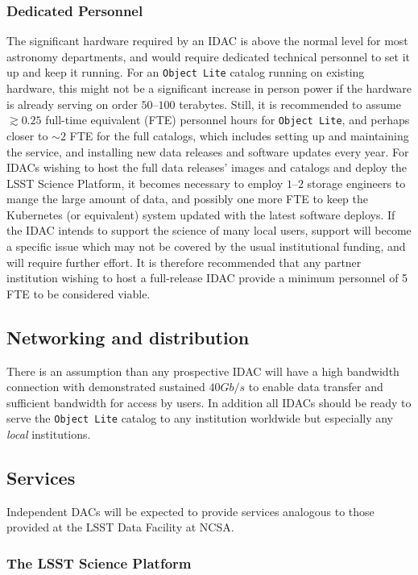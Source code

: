 \subsubsection{Dedicated Personnel}
The significant hardware required by an IDAC is above the normal level for most astronomy departments, and would require dedicated technical personnel to set it up and keep it running. For an {\tt Object Lite} catalog running on existing hardware, this might not be a significant increase in person power if the hardware is already serving on order $50$--$100$ terabytes. Still, it is recommended to assume $\gtrsim0.25$ full-time equivalent (FTE) personnel hours for {\tt Object Lite}, and perhaps closer to $\sim2$ FTE for the full catalogs, which includes setting up and maintaining the service, and installing new data releases and software updates every year. For IDACs wishing to host the full data releases' images and catalogs and deploy the LSST Science Platform, it becomes necessary to employ $1$--$2$ storage engineers to mange the large amount of data, and possibly one more FTE to keep the Kubernetes (or equivalent) system updated with the latest software deploys. If the IDAC intends to support the science of many local users, support will become a specific issue which may not be covered by the usual institutional funding, and will require further effort. It is therefore recommended that any partner institution wishing to host a full-release IDAC provide a minimum personnel of 5 FTE to be considered viable.

\subsection{Networking and distribution}
There is an assumption than any prospective IDAC will have a high bandwidth connection with demonstrated sustained $40 Gb/s$ to enable data transfer and sufficient bandwidth for access by users.
In addition all IDACs should be ready  to serve the {\tt Object Lite} catalog to any institution worldwide but especially any {\em local} institutions.

\subsection{Services}

Independent DACs will be expected to provide services analogous to those provided at the LSST Data Facility at NCSA.

\subsubsection{The LSST Science Platform}

